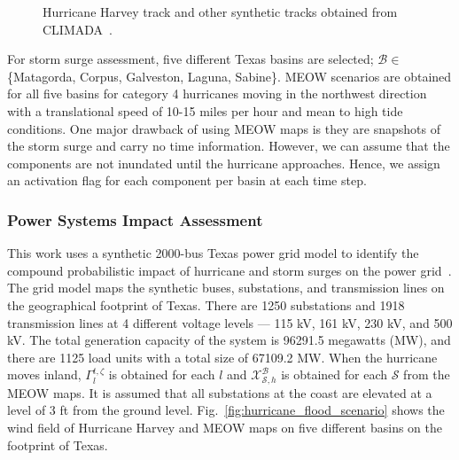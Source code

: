 \begin{figure}[t]
    \centering
        \caption{Hurricane Harvey track and other synthetic tracks obtained from CLIMADA~\cite{Climada}.}
        \label{fig:static_harvey}
\end{figure}

For storm surge assessment, five different Texas basins are selected; $\mathcal{B} \in$ \{Matagorda, Corpus, Galveston, Laguna, Sabine\}. MEOW scenarios are obtained for all five basins for category 4 hurricanes moving in the northwest direction with a translational speed of 10-15 miles per hour and mean to high tide conditions. One major drawback of using MEOW maps is they are snapshots of the storm surge and carry no time information. However, we can assume that the components are not inundated until the hurricane approaches. Hence, we assign an activation flag for each component per basin at each time step. 


\subsubsection{Power Systems Impact Assessment}
This work uses a synthetic 2000-bus Texas power grid model to identify the compound probabilistic impact of hurricane and storm surges on the power grid~\cite{7725528}. The grid model maps the synthetic buses, substations, and transmission lines on the geographical footprint of Texas. There are 1250 substations and 1918 transmission lines at 4 different voltage levels --- 115 kV, 161 kV, 230 kV, and 500 kV. The total generation capacity of the system is 96291.5 megawatts (MW), and there are 1125 load units with a total size of 67109.2 MW. When the hurricane moves inland, $\Gamma_{l}^{t,\zeta}$ is obtained for each $l$ and $\mathcal{X}^\mathcal{B}_{\mathcal{S}, h}$ is obtained for each $\mathcal{S}$ from the MEOW maps. It is assumed that all substations at the coast are elevated at a level of 3 ft from the ground level. Fig.~\ref{fig:hurricane_flood_scenario} shows the wind field of Hurricane Harvey and MEOW maps on five different basins on the footprint of Texas.     

